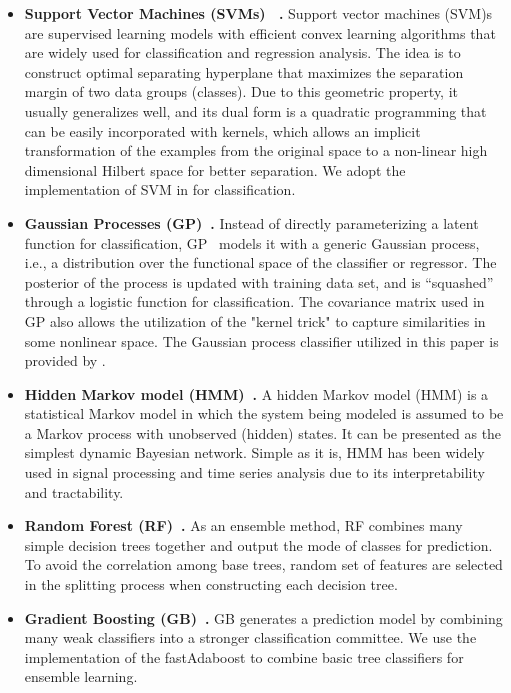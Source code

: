 \begin{itemize}
 \item
  \textbf{Support Vector Machines  (SVMs)~\cite{bib:wang2005support} .}
  Support vector machines (SVM)s are supervised learning models with efficient convex learning algorithms that are widely used for classification and regression analysis.
  The idea is to construct optimal separating hyperplane that maximizes the separation margin of two data groups (classes).
  Due to this geometric property, it usually generalizes well, and its dual form is a quadratic programming that can be easily incorporated with kernels, which allows an implicit transformation of the examples from the original space to a non-linear high dimensional Hilbert space for better separation. We adopt the implementation of SVM in \cite{bib:scikit-learn} for classification.

 \item
 \textbf{Gaussian Processes (GP)~\cite{bib:rasmussen2006gaussian}.}
  Instead of directly parameterizing a latent function for classification, GP~\cite{bib:rasmussen2006gaussian} models it with a generic Gaussian process, i.e., a distribution over the functional space of the classifier or regressor.
  The posterior of the process is updated with training data set, and is ``squashed'' through a logistic function for classification. The covariance matrix used in GP also allows the utilization of the "kernel trick" to capture similarities in some nonlinear space. The Gaussian process classifier utilized in this paper is provided by \cite{bib:scikit-learn}.

  \item
  \textbf{Hidden Markov model (HMM)~\cite{bib:rabiner1986introduction}.}
  A hidden Markov model (HMM) is a statistical Markov model in which the system being modeled is assumed to be a Markov process with unobserved (hidden) states. It can be presented as the simplest dynamic Bayesian network. Simple as it is, HMM has been widely used in signal processing and time series analysis due to its interpretability and tractability.

  \item
  \textbf{Random Forest (RF)~\cite{bib:liaw2002classification}.}
  As an ensemble method, RF combines many simple decision trees together and output the mode of classes for prediction.
  To avoid the correlation among base trees, random set of features are selected in the splitting process when constructing each decision tree.

  \item
  \textbf{Gradient Boosting (GB)~\cite{bib:friedman2002stochastic}.}
  GB generates a prediction model by combining many weak classifiers into a stronger classification committee.
  We use the implementation of the fastAdaboost \cite{bib:fastAdaboost} to combine basic tree classifiers for ensemble learning.


\end{itemize}

